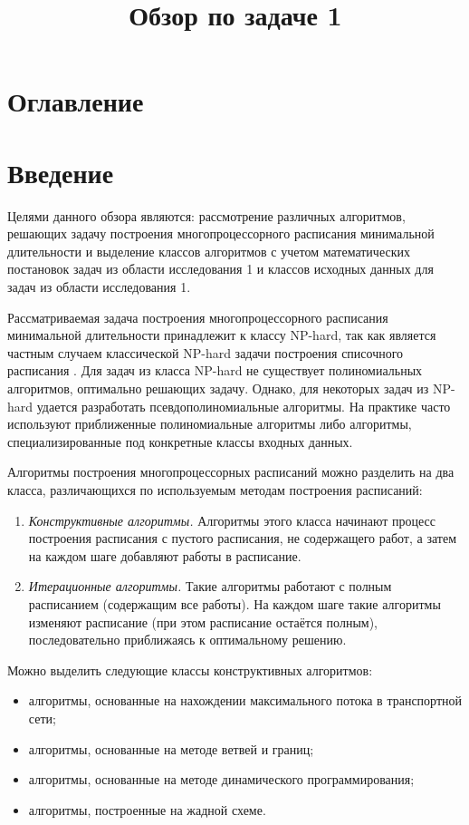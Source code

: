 \documentclass{article}
\title{Обзор по задаче 1}
\begin{document}
\maketitle
\newpage
\section*{Оглавление}
\tableofcontents
\newpage
\section{Введение}
Целями данного обзора являются: рассмотрение различных алгоритмов, решающих задачу построения многопроцессорного расписания минимальной длительности и выделение классов алгоритмов с учетом математических постановок задач из области исследования 1 и классов исходных данных для задач из области исследования 1. \par
Рассматриваемая задача построения многопроцессорного расписания минимальной длительности принадлежит к классу NP-hard, так как является частным случаем классической NP-hard задачи построения списочного расписания \cite{Shakhbazyan_1981}. Для задач из класса NP-hard не существует полиномиальных алгоритмов, оптимально решающих задачу. Однако, для некоторых задач из NP-hard удается разработать псевдополиномиальные алгоритмы. На практике часто используют приближенные полиномиальные алгоритмы либо алгоритмы, специализированные под конкретные классы входных данных.\par
Алгоритмы построения многопроцессорных расписаний можно разделить на два класса, различающихся по используемым методам построения расписаний:
\begin{enumerate}
  \item \textit{Конструктивные алгоритмы.} Алгоритмы этого класса начинают процесс построения расписания с пустого расписания, не содержащего работ, а затем на каждом шаге добавляют работы в расписание.
  \item \textit{Итерационные алгоритмы.} Такие алгоритмы работают с полным расписанием (содержащим все работы). На каждом шаге такие алгоритмы изменяют расписание (при этом расписание остаётся полным), последовательно приближаясь к оптимальному решению.
\end{enumerate}
Можно выделить следующие классы конструктивных алгоритмов:
\begin{itemize}
  \item алгоритмы, основанные на нахождении максимального потока в транспортной сети;
  \item алгоритмы, основанные на методе ветвей и границ;
  \item алгоритмы, основанные на методе динамического программирования;
  \item алгоритмы, построенные на жадной схеме.
\end{itemize}
\end{document}
